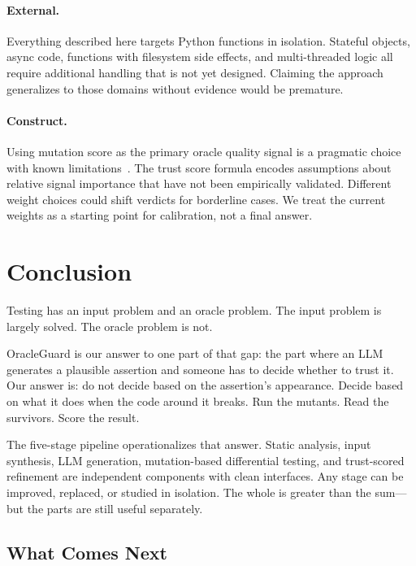 \documentclass[conference]{IEEEtran}
\begin{document}
\paragraph{External.} Everything described here targets Python functions in isolation. Stateful objects, async code, functions with filesystem side effects, and multi-threaded logic all require additional handling that is not yet designed. Claiming the approach generalizes to those domains without evidence would be premature.

\paragraph{Construct.} Using mutation score as the primary oracle quality signal is a pragmatic choice with known limitations~\cite{jia2011mutation,papadakis2019mutation}. The trust score formula encodes assumptions about relative signal importance that have not been empirically validated. Different weight choices could shift verdicts for borderline cases. We treat the current weights as a starting point for calibration, not a final answer.

\section{Conclusion}

Testing has an input problem and an oracle problem. The input problem is largely solved. The oracle problem is not.

OracleGuard is our answer to one part of that gap: the part where an LLM generates a plausible assertion and someone has to decide whether to trust it. Our answer is: do not decide based on the assertion's appearance. Decide based on what it does when the code around it breaks. Run the mutants. Read the survivors. Score the result.

The five-stage pipeline operationalizes that answer. Static analysis, input synthesis, LLM generation, mutation-based differential testing, and trust-scored refinement are independent components with clean interfaces. Any stage can be improved, replaced, or studied in isolation. The whole is greater than the sum—but the parts are still useful separately.

\subsection{What Comes Next}
\end{document}
